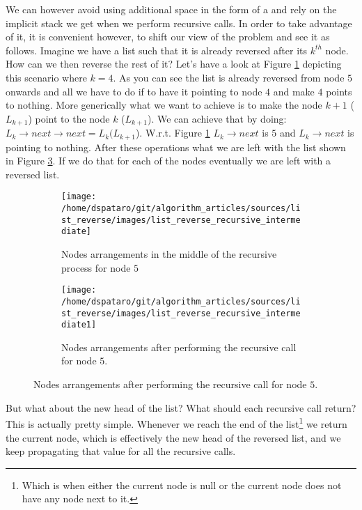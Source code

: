We can however avoid using additional space in the form of a  and rely on the
implicit stack we get when we perform recursive calls. In order to take advantage of it, it is
convenient however, to shift our view of the problem and see it as follows. Imagine we have a list
such that it is already reversed after its $k^{th}$ node. How can we then reverse the rest of it?
Let's have a look at Figure \ref{fig:list_reverse:list_reverse_recursive_intermediate} depicting
this scenario where $k=4$. As you can see the list is already reversed from node $5$ onwards and all
we have to do if to have it pointing to node $4$ and make $4$ points to nothing. More generically
what we want to achieve is to make the node $k+1$ ($L_{k+1}$) point to the node $k$ ($L_{k+1}$). We
can achieve that by doing: $L_{k} \rightarrow next \rightarrow next= L_{k}(L_{k+1}$). W.r.t. Figure
\ref{fig:list_reverse:list_reverse_recursive_intermediate} $L_{k} \rightarrow next$ is $5$ and
$L_{k} \rightarrow next$ is pointing to nothing. After these operations what we are left with the
list  shown in Figure \ref{fig:list_reverse:list_reverse_recursive_intermediate1}. If we do that for
each of the nodes eventually we are left with a reversed list. 

\begin{figure}
	\vspace*{-0.5in}
	\centering
	\begin{subfigure}[t]{0.49\textwidth}
		\centering
		\texttt{[image: /home/dspataro/git/algorithm\_articles/sources/list\_reverse/images/list\_reverse\_recursive\_intermediate]}
		\caption[]{Nodes arrangements in the middle of the recursive process for node $5$}
		\label{fig:list_reverse:list_reverse_recursive_intermediate}
	 \end{subfigure}
	\hfill
	\begin{subfigure}[t]{0.49\textwidth}
		\centering
	\texttt{[image: /home/dspataro/git/algorithm\_articles/sources/list\_reverse/images/list\_reverse\_recursive\_intermediate1]}
	\caption[]{Nodes arrangements after performing the recursive call for node $5$.}
	\label{fig:list_reverse:list_reverse_recursive_intermediate1}
	 \end{subfigure}
\end{figure}
But what about the new head of the list? What should each recursive call return? This is actually
pretty simple. Whenever we reach the end of the list\footnote{Which is when either the current node
is null or the current node does not have any node next to it.} we return the current node, which is
effectively the new head of the reversed list, and we keep propagating that value for all the
recursive calls. 

